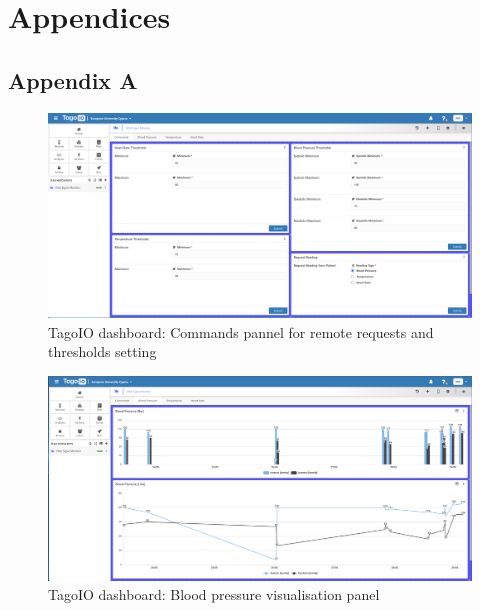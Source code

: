 \chapter*{Appendices}

\section*{Appendix A}

\begin{landscape}
\begin{figure}[H]
	\centering
	\includegraphics[width=\linewidth]{images/tagoio_dashboard_cmds}
	\caption{TagoIO dashboard: Commands pannel for remote requests and thresholds setting}
	\label{appendix:tagoio_commands}
\end{figure}
\end{landscape}

\newpage
\begin{landscape}
\begin{figure}[H]
	\centering
	\includegraphics[width=\linewidth]{images/tagoio_dashboard_bp}
	\caption{TagoIO dashboard: Blood pressure visualisation panel}
	\label{appendix:tagoio_bp}
\end{figure}
\end{landscape}

